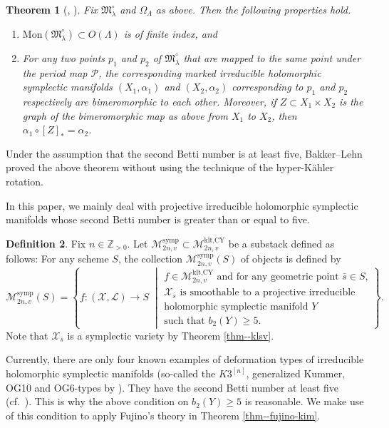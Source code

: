 \documentclass[12pt,twoside]{amsart}
\newtheorem{thm}{Theorem}[section]
\theoremstyle{definition}
\newtheorem{defn}[thm]{Definition}
\begin{document}
\begin{thm}[\cite{Ver}, \cite{BLhk}]\label{thm--verbitsky}
    Fix $\mathfrak{M}_{\lambda}^\circ$ and $\Omega_{\Lambda}$ as above.
    Then the following properties hold.
    \begin{enumerate}
        \item $\mathrm{Mon}(\mathfrak{M}_{\lambda}^\circ)\subset O(\Lambda)$ is of finite index, and 
        \item For any two points $p_1$ and $p_2$ of $\mathfrak{M}_{\lambda}^\circ$ that are mapped to the same point under the period map $\mathcal{P}$, the corresponding marked irreducible holomorphic symplectic manifolds $(X_1,\alpha_1)$ and $(X_2,\alpha_2)$ corresponding to $p_1$ and $p_2$ respectively are bimeromorphic to each other.
Moreover, if $Z\subset X_1\times X_2$ is the graph of the bimeromorphic map as above from $X_1$ to $X_2$, then $\alpha_1\circ [Z]_*=\alpha_2$. 
    \end{enumerate}
\end{thm}

Under the assumption that the second Betti number is at least five, Bakker--Lehn \cite{BLhk} proved the above theorem without using the technique of the hyper-K\"{a}hler rotation. 

In this paper, we mainly deal with projective irreducible holomorphic symplectic manifolds whose second Betti number is greater than or equal to five. 


\begin{defn}\label{defn--symp-moduli}
Fix $n\in\mathbb{Z}_{>0}$.
    Let $\mathcal{M}^{\mathrm{symp}}_{2n,v}\subset\mathcal{M}^{\text{klt,CY}}_{2n,v}$ be a substack defined as follows: For any scheme $S$, the collection $\mathcal{M}^{\mathrm{symp}}_{2n,v}(S)$ of objects is defined by
     \[\mathcal{M}^{\mathrm{symp}}_{2n,v}(S)=
\left\{
 f\colon(\mathcal{X},\mathcal{L})\to S
\;\middle|
\begin{array}{l}
\text{$f\in\mathcal{M}^{\text{klt,CY}}_{2n,v}$ and for any geometric point $\bar{s}\in S$,}\\
\text{$\mathcal{X}_{\bar{s}}$ is smoothable to a projective irreducible}\\
\text{holomorphic symplectic manifold $Y$}\\
\text{such that $b_2(Y)\ge5$.}
\end{array}\right\}.
    \]
Note that $\mathcal{X}_{\bar{s}}$ is a symplectic variety by Theorem \ref{thm--klsv}.
\end{defn}
Currently, there are only four known examples of deformation types of irreducible holomorphic symplectic manifolds (so-called the $K3^{[n]}$, generalized Kummer, OG10 and OG6-types by \cite{beauville,OG10,OG6}).
They have the second Betti number at least five (cf.~\cite{beauville,dCRS,MRS}).
This is why the above condition on $b_2(Y)\ge5$ is reasonable.
We make use of this condition to apply Fujino's theory in Theorem \ref{thm--fujino-kim}.
\end{document}
